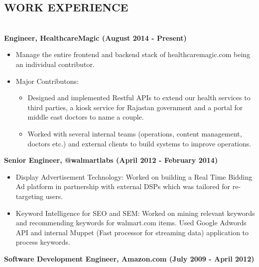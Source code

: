 \documentclass{res}
\begin{document}
 


\address{\textbf{Email:} vijayalekshmikesavan@gmail.com}
\address{\textbf{Mobile:} +919480655011}
                                  
\begin{resume}

\section{WORK EXPERIENCE}
\textbf{\\Engineer, HealthcareMagic (August 2014 - Present)}

\begin{itemize}

\item Manage the entire frontend and backend stack of healthcaremagic.com being an individual contributor. 
\item Major Contributons: 
\begin{itemize}
\item Designed and implemented Restful APIs to extend our health services to third parties, a kiosk service for Rajastan government and a portal for middle east doctors to name a couple.
\item Worked with several internal teams (operations, content management, doctors etc.) and external clients to build systems to improve operations.
\end {itemize}
\end {itemize}
\textbf{Senior Engineer, @walmartlabs (April 2012 - February 2014)}

\begin{itemize}

\item {Display Advertisement Technology:} Worked on building a Real Time Bidding Ad platform in partnership with external DSPs which was tailored for re-targeting users.
\item {Keyword Intelligence for SEO and SEM:} Worked on mining relevant keywords and recommending keywords for walmart.com items. Used Google Adwords API and internal Muppet (Fast processor for streaming data) application to process keywords.
\end {itemize}
\textbf{Software Development Engineer, Amazon.com (July 2009 - April 2012)}


\end{resume}
\end{document}
